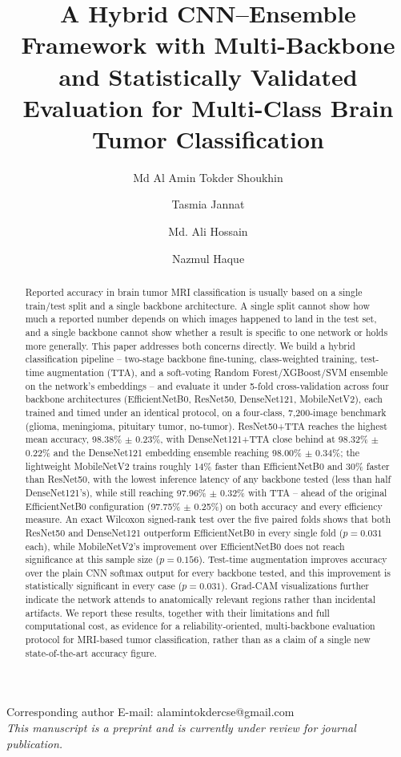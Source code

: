 \documentclass[11pt]{article}
\title{\Large A Hybrid CNN--Ensemble Framework with Multi-Backbone and Statistically Validated Evaluation for Multi-Class Brain Tumor Classification}
\author[1]{Md Al Amin Tokder Shoukhin}
\author[1]{Tasmia Jannat}
\author[1]{Md. Ali Hossain}
\author[1]{Nazmul Haque}
\affil[1]{Department of Computer Science and Engineering, Rajshahi University of Engineering and Technology, Rajshahi-6204, Bangladesh}
\date{}
\begin{document}
\maketitle
\vspace{-2em}
\begin{center}
\small
Corresponding author E-mail: alamintokdercse@gmail.com\\[0.3em]
\textit{This manuscript is a preprint and is currently under review for journal publication.}
\end{center}
\vspace{1em}

\begin{abstract}
Reported accuracy in brain tumor MRI classification is usually based on a single train/test split and a single backbone architecture. A single split cannot show how much a reported number depends on which images happened to land in the test set, and a single backbone cannot show whether a result is specific to one network or holds more generally. This paper addresses both concerns directly. We build a hybrid classification pipeline -- two-stage backbone fine-tuning, class-weighted training, test-time augmentation (TTA), and a soft-voting Random Forest/XGBoost/SVM ensemble on the network's embeddings -- and evaluate it under 5-fold cross-validation across four backbone architectures (EfficientNetB0, ResNet50, DenseNet121, MobileNetV2), each trained and timed under an identical protocol, on a four-class, 7,200-image benchmark (glioma, meningioma, pituitary tumor, no-tumor). ResNet50+TTA reaches the highest mean accuracy, 98.38\% $\pm$ 0.23\%, with DenseNet121+TTA close behind at 98.32\% $\pm$ 0.22\% and the DenseNet121 embedding ensemble reaching 98.00\% $\pm$ 0.34\%; the lightweight MobileNetV2 trains roughly 14\% faster than EfficientNetB0 and 30\% faster than ResNet50, with the lowest inference latency of any backbone tested (less than half DenseNet121's), while still reaching 97.96\% $\pm$ 0.32\% with TTA -- ahead of the original EfficientNetB0 configuration (97.75\% $\pm$ 0.25\%) on both accuracy and every efficiency measure. An exact Wilcoxon signed-rank test over the five paired folds shows that both ResNet50 and DenseNet121 outperform EfficientNetB0 in every single fold ($p=0.031$ each), while MobileNetV2's improvement over EfficientNetB0 does not reach significance at this sample size ($p=0.156$). Test-time augmentation improves accuracy over the plain CNN softmax output for every backbone tested, and this improvement is statistically significant in every case ($p=0.031$). Grad-CAM visualizations further indicate the network attends to anatomically relevant regions rather than incidental artifacts. We report these results, together with their limitations and full computational cost, as evidence for a reliability-oriented, multi-backbone evaluation protocol for MRI-based tumor classification, rather than as a claim of a single new state-of-the-art accuracy figure.
\end{abstract}
\end{document}

